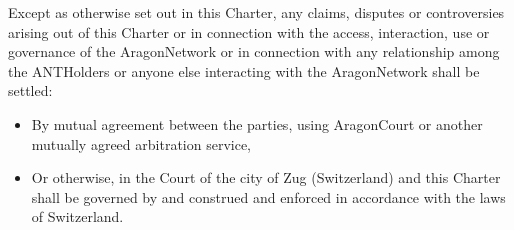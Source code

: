 Except as otherwise set out in this Charter, any claims, disputes or controversies arising out of this Charter or in connection with the access, interaction, use or governance of the \gls{AragonNetwork} or in connection with any relationship among the \glspl{ANTHolder} or anyone else interacting with the \gls{AragonNetwork} shall be settled:
\begin{itemize}
	\item By mutual agreement between the parties, using \gls{AragonCourt} or another mutually agreed arbitration service,
	\item Or otherwise, in the Court of the city of Zug (Switzerland) and this Charter shall be governed by and construed and enforced in accordance with the laws of Switzerland.
\end{itemize}


